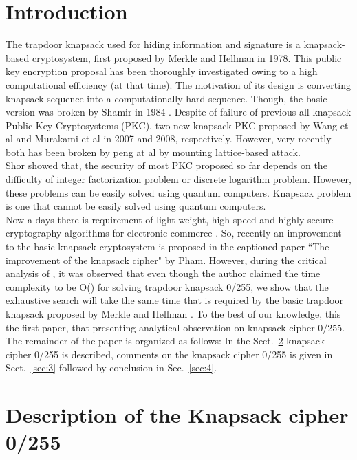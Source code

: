 \documentclass[5p,times,twocolumn]{elsarticle}
\begin{document}
\section{Introduction}
\label{intro}
The trapdoor knapsack used for hiding information and signature is a knapsack-based cryptosystem, first proposed by Merkle and Hellman \cite{merkle1978hiding} in 1978. This public key encryption proposal has been thoroughly investigated owing to a high computational efficiency (at that time). The motivation of its design is converting  knapsack sequence into a computationally hard sequence. Though, the basic version was broken by Shamir in 1984 \cite{shamir1984polynomial}. Despite of failure of previous all knapsack Public Key Cryptosystems (PKC), two new knapsack PKC proposed by Wang et al \cite{wang2007knapsack} and Murakami et al \cite{murakami2008new} in 2007 and 2008, respectively. However, very recently both has been broken by peng at al \cite{peng2013analysis} by mounting lattice-based attack.\\
\indent Shor \cite{shor1997polynomial} showed that, the security of most PKC proposed so far depends on the difficulty of integer factorization problem or discrete logarithm problem. However, these problems can be easily solved using quantum computers. Knapsack problem is one that cannot be easily solved using quantum computers.\\ 
\indent Now a days there is requirement of light weight, high-speed and highly secure cryptography algorithms for electronic commerce \cite{hamilton1997commerce}. So, recently an improvement to the basic knapsack cryptosystem is proposed in the captioned paper ``The improvement of the knapsack cipher" by Pham\cite{pham2011improvement}. However, during the critical analysis of \cite{pham2011improvement}, it was observed that even though the author claimed the time complexity to be O() for solving trapdoor knapsack 0/255, we show that the exhaustive search will take the same time that is required by the basic trapdoor knapsack proposed by Merkle and Hellman \cite{merkle1978hiding}. To the best of our knowledge, this the first paper, that presenting analytical observation on knapsack cipher 0/255.\\ 
\indent The remainder of the paper is organized as follows: In the Sect.~\ref{sec:2} knapsack cipher 0/255 is described, comments on the knapsack cipher 0/255 is given in Sect.~\ref{sec:3} followed by conclusion in Sec.~\ref{sec:4}.

\section{Description of the Knapsack cipher 0/255}
\label{sec:2}
\end{document}

